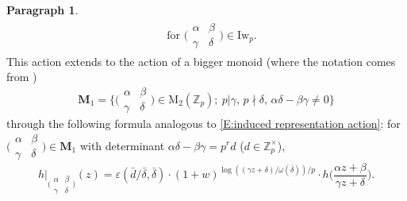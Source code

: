 \documentclass[12pt]{amsart}
\theoremstyle{definition}
\newtheorem{para}[subsection]{Paragraph}
\numberwithin{equation}{subsection}
\def\ZZ{\mathbb{Z}}
\def\bfM{\mathbf{M}}
\def\rmM{\mathrm{M}}
\newcommand{\Iw}{\mathrm{Iw}}
\newcommand{\Matrix}[4]{{\big(\begin{smallmatrix}#1&#2\\#3& #4\end{smallmatrix} \big)}}
\begin{document}
\begin{para}
\begin{eqnarray}
\quad \textrm{for } \Matrix \alpha\beta{\gamma}\delta \in \Iw_p.
\end{eqnarray}
This action extends to the action of a bigger monoid (where the notation comes from \cite[\S\,4]{buzzard2})
$$
\mathbf{M}_1=\big\{\Matrix \alpha\beta\gamma\delta \in \rmM_2(\ZZ_p);  \ p|\gamma,\,p\nmid \delta,\, \alpha \delta-\beta \gamma \neq 0\big\}
$$
through the following formula analogous to \eqref{E:induced representation action}: for $\Matrix \alpha \beta \gamma \delta \in \bfM_1$ with determinant $\alpha \delta - \beta\gamma = p^r d$ ($d \in \ZZ_p^\times$),
\begin{equation}
\label{E:induced representation action extended}
h\big|_{\Matrix \alpha\beta{\gamma}\delta}(z) = \varepsilon(\bar d /  \bar \delta, \bar \delta) \cdot (1+w)^{\log\left((\gamma z+\delta )/ \omega(\bar \delta)\right)/p} \cdot h\Big( \frac{\alpha z+\beta}{\gamma z+\delta}\Big).
\end{equation}
\end{para}
\end{document}
